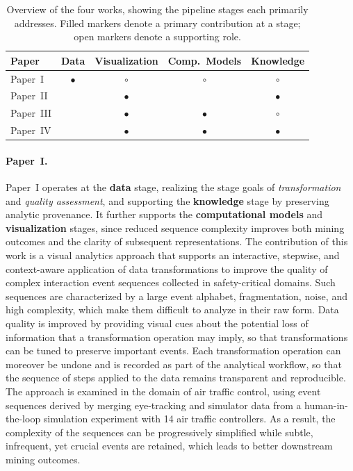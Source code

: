 \begin{table}[H]
\centering
\caption{%
  Overview of the four works, showing the pipeline stages each primarily addresses.
  Filled markers denote a primary contribution at a stage; open markers denote a supporting role.
}
\label{tab:overview-mapping}
\begin{tabular}{lcccc}
\toprule
Paper     & Data      & Visualization & Comp.\ Models & Knowledge  \\
\midrule
Paper~I   & $\bullet$ & $\circ$       & $\circ$       & $\circ$    \\
Paper~II  &           & $\bullet$     &               & $\bullet$  \\
Paper~III &           & $\bullet$     & $\bullet$     & $\circ$    \\
Paper~IV  &           & $\bullet$     & $\bullet$     & $\bullet$  \\
\bottomrule
\end{tabular}
\end{table}


\paragraph{Paper~I.}
Paper~I operates at the \textbf{data} stage, realizing the stage goals of \textit{transformation} and \textit{quality assessment}, and supporting the \textbf{knowledge} stage by preserving analytic provenance.
It further supports the \textbf{computational models} and \textbf{visualization} stages, since reduced sequence complexity improves both mining outcomes and the clarity of subsequent representations.
The contribution of this work is a visual analytics approach that supports an interactive, stepwise, and context-aware application of data transformations to improve the quality of complex interaction event sequences collected in safety-critical domains.
Such sequences are characterized by a large event alphabet, fragmentation, noise, and high complexity, which make them difficult to analyze in their raw form.
Data quality is improved by providing visual cues about the potential loss of information that a transformation operation may imply, so that transformations can be tuned to preserve important events.
Each transformation operation can moreover be undone and is recorded as part of the analytical workflow, so that the sequence of steps applied to the data remains transparent and reproducible.
The approach is examined in the domain of air traffic control, using event sequences derived by merging eye-tracking and simulator data from a human-in-the-loop simulation experiment with 14 air traffic controllers.
As a result, the complexity of the sequences can be progressively simplified while subtle, infrequent, yet crucial events are retained, which leads to better downstream mining outcomes.


